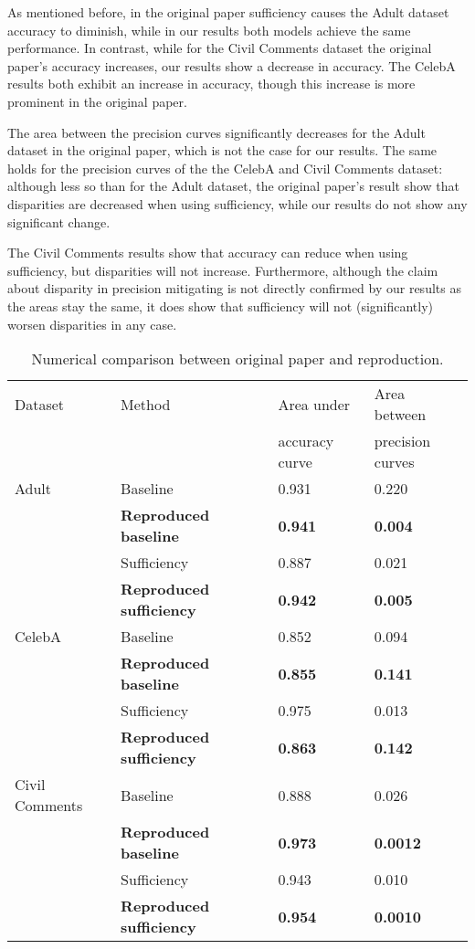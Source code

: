 As mentioned before, in the original paper sufficiency causes the Adult dataset accuracy to diminish, while in our results both models achieve the same performance. In contrast, while for the Civil Comments dataset the original paper's accuracy increases, our results show a decrease in accuracy. The CelebA results both exhibit an increase in accuracy, though this increase is more prominent in the original paper.

The area between the precision curves significantly decreases for the Adult dataset in the original paper, which is not the case for our results. The same holds for the precision curves of the the CelebA and Civil Comments dataset: although less so than for the Adult dataset, the original paper's result show that disparities are decreased when using sufficiency, while our results do not show any significant change.

The Civil Comments results show that accuracy can reduce when using sufficiency, but disparities will not increase. Furthermore, although the claim about disparity in precision mitigating is not directly confirmed by our results as the areas stay the same, it does show that sufficiency will not (significantly) worsen disparities in any case.

\begin{table}[h]
\centering
\begin{tabular}{l  l  l l}
Dataset & Method & Area under & Area between \\
&& accuracy curve & precision curves\\
\hline
Adult & Baseline & 0.931 & 0.220\\
& \textbf{Reproduced baseline} & \textbf{0.941} & \textbf{0.004} \\
& Sufficiency & 0.887 & 0.021\\
& \textbf{Reproduced sufficiency} & \textbf{0.942} & \textbf{0.005}\\
\hline
CelebA & Baseline & 0.852 & 0.094\\
& \textbf{Reproduced baseline} & \textbf{0.855} & \textbf{0.141}\\
& Sufficiency & 0.975 & 0.013\\
& \textbf{Reproduced sufficiency} & \textbf{0.863} & \textbf{0.142}\\
\hline
Civil Comments & Baseline & 0.888 & 0.026\\
& \textbf{Reproduced baseline} & \textbf{0.973} & \textbf{0.0012}\\
& Sufficiency & 0.943 & 0.010\\
& \textbf{Reproduced sufficiency} & \textbf{0.954} & \textbf{0.0010}\\
\hline

\end{tabular}
\caption{Numerical comparison between original paper and reproduction.}
\label{tab:numeric}
\end{table}


